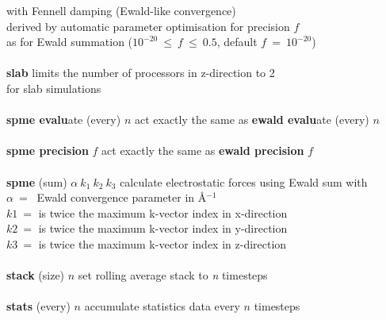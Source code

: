\begin{tabbing}
\>                                              \> with Fennell \cite{fennell-06a} damping (Ewald-like convergence) \\
\>                                              \> derived by automatic parameter optimisation for precision $f$ \\
\>                                              \> as for Ewald summation ($10^{-20}~\le~f~\le~0.5$, default $f~=~10^{-20}$) \\
\>                                              \> \\
\> {\bf slab}                                   \> limits the number of processors in z-direction to 2 \\
\>                                              \> for slab simulations \\
\>                                              \> \\
\> {\bf spme evalu}ate (every) $n$              \> act exactly the same as {\bf ewald evalu}ate (every) $n$ \\
\>                                              \> \\
\> {\bf spme precision} $f$                     \> act exactly the same as {\bf ewald precision} $f$ \\
\>                                              \> \\
\> {\bf spme} (sum) $\alpha~k_{1}~k_{2}~k_{3}$  \> calculate electrostatic forces using Ewald sum with \\
\>                                              \> $\alpha~=~$ Ewald convergence parameter in \AA$^{-1}$ \\
\>                                              \> $k1~=$ is twice the maximum k-vector index in x-direction \\
\>                                              \> $k2~=$ is twice the maximum k-vector index in y-direction \\
\>                                              \> $k3~=$ is twice the maximum k-vector index in z-direction \\
\>                                              \> \\
\> {\bf stack} (size) $n$                       \> set rolling average stack to {\em n} timesteps \\
\>                                              \> \\
\> {\bf stats} (every) $n$                      \> accumulate statistics data every $n$ timesteps \\

\end{tabbing}
